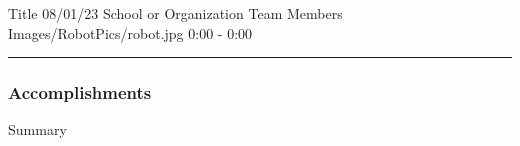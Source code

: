 \insertmeeting
	{Title} 
	{08/01/23} 
	{School or Organization}
	{Team Members}
	{Images/RobotPics/robot.jpg}
	{0:00 - 0:00}

 

\noindent\hfil\rule{\textwidth}{.4pt}\hfil

\subsubsection*{Accomplishments}
Summary

